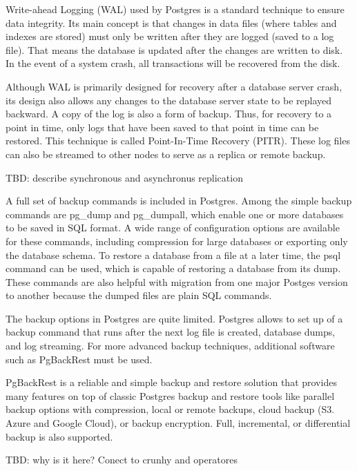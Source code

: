 Write-ahead Logging (WAL) used by Postgres is a standard technique to ensure data integrity. Its main concept is that changes in data files (where tables and indexes are stored) must only be written after they are logged (saved to a log file). That means the database is updated after the changes are written to disk. In the event of a system crash, all transactions will be recovered from the disk. \cite{docuPgWal}

Although WAL is primarily designed for recovery after a database server crash, its design also allows any changes to the database server state to be replayed backward. A copy of the log is also a form of backup. Thus, for recovery to a point in time, only logs that have been saved to that point in time can be restored. This technique is called Point-In-Time Recovery (PITR). \cite{DocuPgPITR} These log files can also be streamed to other nodes to serve as a replica or remote backup. \cite{pg14replication}

TBD: describe synchronous and asynchronus replication

A full set of backup commands is included in Postgres. Among the simple backup commands are pg\_dump and pg\_dumpall, which enable one or more databases to be saved in SQL format. A wide range of configuration options are available for these commands, including compression for large databases or exporting only the database schema. To restore a database from a file at a later time, the psql command can be used, which is capable of restoring a database from its dump. \cite{DocuPgDump} These commands are also helpful with migration from one major Postges version to another because the dumped files are plain SQL commands.

The backup options in Postgres are quite limited. Postgres allows to set up of a backup command that runs after the next log file is created, database dumps, and log streaming. For more advanced backup techniques, additional software such as PgBackRest must be used. \cite{DocuPgPITR}

PgBackRest is a reliable and simple backup and restore solution that provides many features on top of classic Postgres backup and restore tools like parallel backup options with compression, local or remote backups, cloud backup (S3. Azure and Google Cloud), or backup encryption. Full, incremental, or differential backup is also supported. \cite{PGbackRest}

TBD: why is it here? Conect to crunhy and operatores


